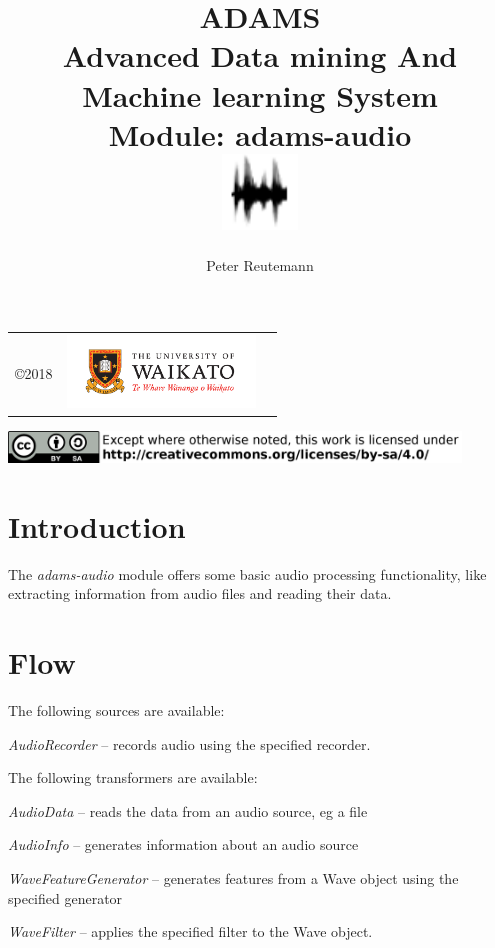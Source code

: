 \documentclass[a4paper]{book}
\title{
  \textbf{ADAMS} \\
  {\Large \textbf{A}dvanced \textbf{D}ata mining \textbf{A}nd \textbf{M}achine
  learning \textbf{S}ystem} \\
  {\Large Module: adams-audio} \\
  \vspace{1cm}
  \includegraphics[width=2cm]{images/audio-module.png} \\
}
\author{
  Peter Reutemann
}
\begin{document}
\begin{titlepage}
\maketitle

\thispagestyle{empty}
\center
\begin{table}[b]
	\begin{tabular}{c l l}
		\parbox[c][2cm]{2cm}{\copyright 2018} &
		\parbox[c][2cm]{5cm}{\includegraphics[width=5cm]{images/coat_of_arms.pdf}} \\
	\end{tabular}
	\includegraphics[width=12cm]{images/cc.png} \\
\end{table}

\end{titlepage}

\tableofcontents

\chapter{Introduction}
The \textit{adams-audio} module offers some basic audio processing functionality,
like extracting information from audio files and reading their data.

\chapter{Flow}
The following sources are available:
\begin{tight_itemize}
  \item \textit{AudioRecorder} -- records audio using the specified recorder.
\end{tight_itemize}

\noindent The following transformers are available:
\begin{tight_itemize}
  \item \textit{AudioData} -- reads the data from an audio source, eg a file
  \item \textit{AudioInfo} -- generates information about an audio source
  \item \textit{WaveFeatureGenerator} -- generates features from a Wave object
  using the specified generator
  \item \textit{WaveFilter} -- applies the specified filter to the Wave object.
\end{tight_itemize}
\end{document}
